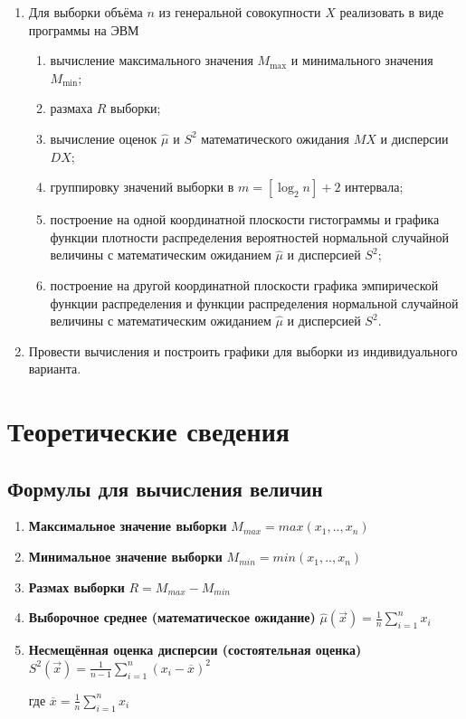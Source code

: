 \documentclass[12pt]{report}
\begin{document}
\begin{enumerate}
	\item Для выборки объёма $n$ из генеральной совокупности $X$ реализовать в виде программы на ЭВМ
	\begin{enumerate}
		\item вычисление максимального значения $M_{\max}$ и минимального значения $M_{\min}$;
		\item размаха $R$ выборки;
		\item вычисление оценок $\hat\mu$ и $S^2$ математического ожидания $MX$ и дисперсии $DX$;
		\item группировку значений выборки в $m = [\log_2 n] + 2$ интервала;
		\item построение на одной координатной плоскости гистограммы и графика функции плотности распределения вероятностей нормальной случайной величины с математическим ожиданием $\hat{\mu}$ и дисперсией $S^2$;
		\item построение на другой координатной плоскости графика эмпирической функции распределения и функции распределения нормальной случайной величины с математическим ожиданием $\hat{\mu}$ и дисперсией $S^2$.
	\end{enumerate}
	\item Провести вычисления и построить графики для выборки из индивидуального варианта.
\end{enumerate}

\chapter*{Теоретические сведения}

\section*{Формулы для вычисления величин}

\begin{enumerate}
	\item \textbf{Максимальное значение выборки}
	$M_{max} = max(x_1, .., x_n)$
	\item \textbf{Минимальное значение выборки}
	$M_{min} = min(x_1, .., x_n)$
	\item \textbf{Размах выборки}
	$R = M_{max} - M_{min}$
	\item \textbf{Выборочное среднее (математическое ожидание)}
	$\hat \mu(\vec x) = \frac{1}{n} \sum_{i=1}^n x_i$
	\item \textbf{Несмещённая оценка дисперсии (состоятельная оценка)}
	$S^2 (\vec x) = \frac{1}{n-1} \sum_{i=1}^n (x_i - \overline x)^2$
	
	где $ \overline{x} = \frac{1}{n} \sum_{i=1}^n x_i$
\end{enumerate}
\end{document}
